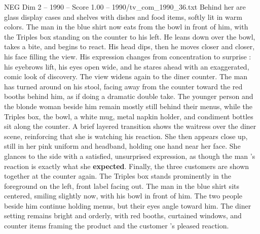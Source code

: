 \begin{textsample}{NEG Dim 2 – 1990 – Score 1.00 – 1990/tv\_com\_1990\_36.txt}
Behind her are glass display cases and shelves with dishes and food items, softly lit in warm colors.
The man in the blue shirt now eats from the bowl in front of him, with the Triples box standing on the counter to his left.
He leans down over the bowl, takes a bite, and begins to react.
His head dips, then he moves closer and closer, his face filling the view.
His expression changes from concentration to surprise : his eyebrows lift, his eyes open wide, and he stares ahead with an exaggerated, comic look of discovery.
The view widens again to the diner counter.
The man has turned around on his stool, facing away from the counter toward the red booths behind him, as if doing a dramatic double take.
The younger person and the blonde woman beside him remain mostly still behind their menus, while the Triples box, the bowl, a white mug, metal napkin holder, and condiment bottles sit along the counter.
A brief layered transition shows the waitress over the diner scene, reinforcing that she is watching his reaction.
She then appears close up, still in her pink uniform and headband, holding one hand near her face.
She glances to the side with a satisfied, unsurprised expression, as though the man ’s reaction is exactly what she \textbf{expected}.
Finally, the three customers are shown together at the counter again.
The Triples box stands prominently in the foreground on the left, front label facing out.
The man in the blue shirt sits centered, smiling slightly now, with his bowl in front of him.
The two people beside him continue holding menus, but their eyes angle toward him.
The diner setting remains bright and orderly, with red booths, curtained windows, and counter items framing the product and the customer ’s pleased reaction.

\end{textsample}
